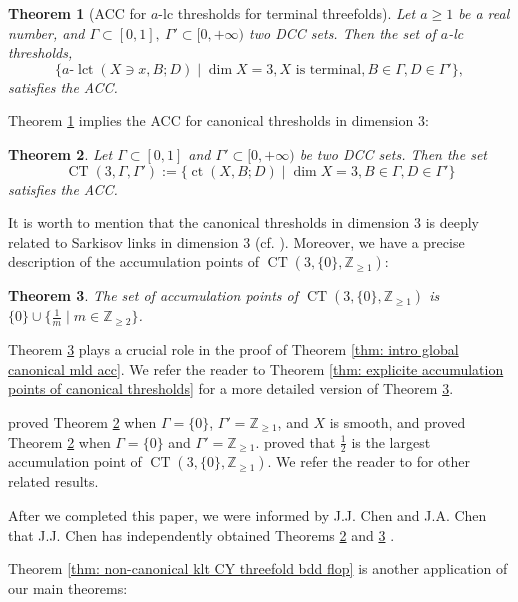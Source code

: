 \documentclass[11pt]{amsart}
\numberwithin{equation}{section}
\newcommand{\Zz}{\mathbb{Z}}
\newcommand{\lct}{\operatorname{lct}}
\newcommand{\ct}{\operatorname{ct}}
\newcommand{\CT}{\operatorname{CT}}
\newcommand{\Ii}{{\Gamma}}
\newtheorem{thm}{Theorem}[section]
\theoremstyle{definition}
\theoremstyle{definition}
\begin{document}
\begin{thm}[ACC for $a$-lc thresholds for terminal threefolds]\label{thm: alct acc terminal threefold}
Let $a\geq 1$ be a real number, and $\Ii\subset [0,1],~\Ii'\subset [0,+\infty)$ two DCC sets. Then the set of $a$-lc thresholds,
   $$\{a\text{-}\lct(X\ni x,B;D)\mid \dim X=3, X\text{ is terminal}, B\in\Ii, D\in\Ii'\},$$
     satisfies the ACC.
\end{thm}

Theorem \ref{thm: alct acc terminal threefold} implies the ACC for canonical thresholds in dimension $3$:
\begin{thm}\label{thm: 3fold acc ct}
Let $\Ii\subset[0,1]$ and $\Ii'\subset[0,+\infty)$ be two DCC sets. Then the set
$$\CT(3,\Ii,\Ii'):=\{\ct(X,B;D)\mid\dim X=3, B\in \Ii,D\in\Ii'\}$$
satisfies the ACC.
\end{thm}

It is worth to mention that the canonical thresholds in dimension $3$ is deeply related to Sarkisov links in dimension $3$ (cf. \cite{Cor95,Pro18}). Moreover, we have a precise description of the accumulation points of $\CT(3,\{0\},\Zz_{\ge 1})$:

\begin{thm}\label{thm: Accumulation points}
The set of accumulation points of $\CT(3,\{0\},\Zz_{\ge 1})$ is $\{0\}\cup\{\frac{1}{m}\mid m\in\Zz_{\ge 2}\}$.
\end{thm}


Theorem \ref{thm: Accumulation points} plays a crucial role in the proof of  Theorem \ref{thm: intro global canonical mld acc}. We refer the reader to Theorem \ref{thm: explicite accumulation points of canonical thresholds} for a more detailed version of Theorem \ref{thm: Accumulation points}. 

\cite[Theorem 1.7]{Ste11} proved Theorem \ref{thm: 3fold acc ct} when $\Ii=\{0\}$, $\Ii'=\Zz_{\ge1}$, and $X$ is smooth, and \cite[Theorem 1.2]{Che19} proved Theorem \ref{thm: 3fold acc ct} when $\Ii=\{0\}$ and $\Ii'=\Zz_{\ge1}$. \cite[Theorem 1.3]{Che19} proved that $\frac{1}{2}$ is the largest accumulation point of $\CT(3,\{0\},\Zz_{\ge1})$. We refer the reader to \cite{Shr06,Pro08} for other related results. 

After we completed this paper, we were informed by J.J. Chen and J.A. Chen that J.J. Chen has independently obtained Theorems \ref{thm: 3fold acc ct} and \ref{thm: Accumulation points} \cite[Theorems 1.1, 1.2]{Che22}.

\medskip

Theorem \ref{thm: non-canonical klt CY threefold bdd flop} is another application of our main theorems:
\end{document}
